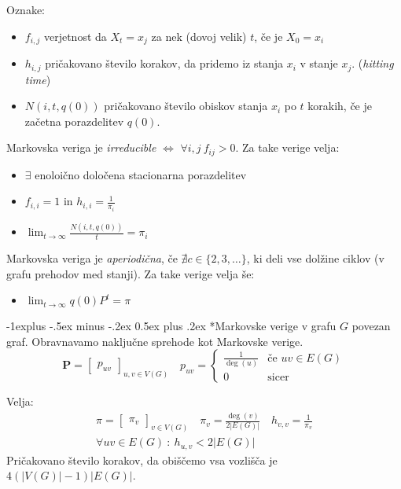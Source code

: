 \documentclass[a3paper,8pt]{extarticle}
\makeatletter
\renewcommand{\subsection}{\@startsection{subsection}{2}{0mm}%
                                {-1explus -.5ex minus -.2ex}%
                                {0.5ex plus .2ex}%
                                {\normalfont\normalsize\bfseries}}
\makeatother
\begin{document}
\begin{multicols}{4}
Oznake:
\begin{itemize}
    \item $f_{i,j}$ verjetnost da $X_t = x_j$ za nek (dovoj velik) $t$, če je $X_0 = x_i$
    \item $h_{i,j}$ pričakovano število korakov, da pridemo iz stanja $x_i$ v stanje $x_j$. (\textit{hitting time})
    \item $N(i, t, q(0))$ pričakovano število obiskov stanja $x_i$ po $t$ korakih, če je začetna porazdelitev $q(0)$.
\end{itemize}

Markovska veriga je \textit{irreducible} $\iff$ $\forall i, j \ f_{ij} > 0$. Za take verige velja:
\begin{itemize}
    \item $\exists$ enoloično določena stacionarna porazdelitev
    \item $f_{i,i} = 1$ in $h_{i,i} = \frac{1}{\pi_i}$
    \item $\lim_{t \to \infty} \frac{N(i, t, q(0))}{t} = \pi_i$
\end{itemize}

Markovska veriga je \textit{aperiodična}, če $\nexists c \in \{2, 3, \dots\}$, ki deli vse dolžine ciklov (v grafu prehodov med stanji). Za take verige velja še:
\begin{itemize}
    \item $\lim_{t \to \infty} q(0)P^t = \pi$
\end{itemize}


\subsection*{Markovske verige v grafu}
$G$ povezan graf. Obravnavamo naključne sprehode kot Markovske verige.
\[ \mathbf{P} = \begin{bmatrix}
    p_{uv}
\end{bmatrix}_{u,v \in V(G)} \quad 
    p_{uv} = \begin{cases}
    \frac{1}{\deg(u)} & \text{če } uv \in E(G) \\
    0 & \text{sicer}
\end{cases}\]

Velja:
\begin{gather*}
    \pi = \begin{bmatrix}
        \pi_v
    \end{bmatrix}_{v \in V(G)} \quad
    \pi_v = \frac{\deg(v)}{2|E(G)|}  \quad
    h_{v,v} = \frac{1}{\pi_v} \\
    \forall uv \in E(G)\ :\ h_{u,v} < 2|E(G)|
\end{gather*}
Pričakovano število korakov, da obiščemo vsa vozlišča je $4(|V(G)|-1)|E(G)|$.


\end{multicols}
\end{document}
